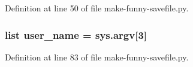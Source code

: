 Definition at line 50 of file make-\/funny-\/savefile.\+py.

\hypertarget{namespacemake-funny-savefile_a4176a45fbd4c8ae5f0c58cbedb659359}{
\subsubsection[{user\+\_\+name}]{\setlength{\rightskip}{0pt plus 5cm}list user\+\_\+name = sys.\+argv\mbox{[}3\mbox{]}}}\label{namespacemake-funny-savefile_a4176a45fbd4c8ae5f0c58cbedb659359}


Definition at line 83 of file make-\/funny-\/savefile.\+py.

